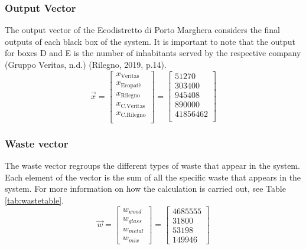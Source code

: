  \subsubsection{Output Vector}
 The output vector of the Ecodistretto di Porto Marghera considers the final outputs of each black box of the system. It is important to note that the output for boxes D and E is the number of inhabitants served by the respective company (Gruppo Veritas, n.d.) (Rilegno, 2019, p.14).
        \begin{equation}
            \vec{x}=
            \begin{bmatrix}
                x_{\text{Veritas}}\\
                x_{\text{Ecopatè}}\\
                x_{\text{Rilegno}}\\
                x_{\text{C.Veritas}}\\
                x_{\text{C.Rilegno}}\\
            \end{bmatrix}
            =
            \begin{bmatrix}
                51270 \\
                303400 \\
                945408 \\
                890000 \\
                41856462 \\
            \end{bmatrix}
        \end{equation}

\subsubsection{Waste vector}
The waste vector regroups the different types of waste that appear in the system. Each element of the vector is the sum of all the specific waste that appears in the system. For more information on how the calculation is carried out, see Table \ref{tab:wastetable}.
        \begin{equation}
            \vec{w}=
            \begin{bmatrix}
                w_{wood} \\
                w_{glass} \\
                w_{metal} \\
                w_{mix}
            \end{bmatrix}
            =
            \begin{bmatrix}
                4685555 \\
                31800 \\
                53198 \\
                149946 
            \end{bmatrix}
        \end{equation}

